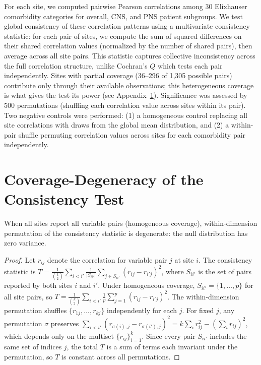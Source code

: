 \documentclass{article}
\begin{document}
For each site, we computed pairwise Pearson correlations among 30 Elixhauser comorbidity categories for overall, CNS, and PNS patient subgroups.
We test global consistency of these correlation patterns using a multivariate consistency statistic: for each pair of sites, we compute the sum of squared differences on their shared correlation values (normalized by the number of shared pairs), then average across all site pairs.
This statistic captures collective inconsistency across the full correlation structure, unlike Cochran's $Q$ which tests each pair independently.
Sites with partial coverage (36--296 of 1,305 possible pairs) contribute only through their available observations; this heterogeneous coverage is what gives the test its power (see Appendix~\ref{app:degeneracy}).
Significance was assessed by 500 permutations (shuffling each correlation value across sites within its pair).
Two negative controls were performed: (1) a homogeneous control replacing all site correlations with draws from the global mean distribution, and (2) a within-pair shuffle permuting correlation values across sites for each comorbidity pair independently.


\appendix

\section{Coverage-Degeneracy of the Consistency Test}
\label{app:degeneracy}

\begin{proposition}
When all sites report all variable pairs (homogeneous coverage), within-dimension permutation of the consistency statistic is degenerate: the null distribution has zero variance.
\end{proposition}

\begin{proof}
Let $r_{ij}$ denote the correlation for variable pair $j$ at site $i$.  The consistency statistic is $T = \frac{1}{\binom{k}{2}} \sum_{i < i'} \frac{1}{|S_{ii'}|} \sum_{j \in S_{ii'}} (r_{ij} - r_{i'j})^2$, where $S_{ii'}$ is the set of pairs reported by both sites $i$ and $i'$.
Under homogeneous coverage, $S_{ii'} = \{1, \ldots, p\}$ for all site pairs, so $T = \frac{1}{\binom{k}{2}} \sum_{i < i'} \frac{1}{p} \sum_{j=1}^{p} (r_{ij} - r_{i'j})^2$.
The within-dimension permutation shuffles $\{r_{1j}, \ldots, r_{kj}\}$ independently for each $j$.
For fixed $j$, any permutation $\sigma$ preserves $\sum_{i<i'} (r_{\sigma(i),j} - r_{\sigma(i'),j})^2 = k \sum_i r_{ij}^2 - (\sum_i r_{ij})^2$, which depends only on the multiset $\{r_{ij}\}_{i=1}^k$.
Since every pair $S_{ii'}$ includes the same set of indices $j$, the total $T$ is a sum of terms each invariant under the permutation, so $T$ is constant across all permutations.
\end{proof}
\end{document}
